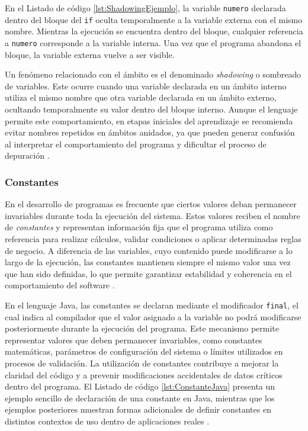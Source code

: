 \documentclass[12pt,twoside]{book}
\begin{document}
						En el Listado de código \ref{lst:ShadowingEjemplo}, la variable \texttt{numero} declarada dentro del bloque del \texttt{if} oculta temporalmente a la variable externa con el mismo nombre. Mientras la ejecución se encuentra dentro del bloque, cualquier referencia a \texttt{numero} corresponde a la variable interna. Una vez que el programa abandona el bloque, la variable externa vuelve a ser visible.
						
						Un fenómeno relacionado con el ámbito es el denominado \textit{shadowing} o sombreado de variables. Este ocurre cuando una variable declarada en un ámbito interno utiliza el mismo nombre que otra variable declarada en un ámbito externo, ocultando temporalmente su valor dentro del bloque interno. Aunque el lenguaje permite este comportamiento, en etapas iniciales del aprendizaje se recomienda evitar nombres repetidos en ámbitos anidados, ya que pueden generar confusión al interpretar el comportamiento del programa y dificultar el proceso de depuración \cite{Qian2018Students,Robins2003Learning,Lister2004Learning}.
	
					\subsubsection{Constantes}
						\noindent
						En el desarrollo de programas es frecuente que ciertos valores deban permanecer invariables durante toda la ejecución del sistema. Estos valores reciben el nombre de \textit{constantes} y representan información fija que el programa utiliza como referencia para realizar cálculos, validar condiciones o aplicar determinadas reglas de negocio. A diferencia de las variables, cuyo contenido puede modificarse a lo largo de la ejecución, las constantes mantienen siempre el mismo valor una vez que han sido definidas, lo que permite garantizar estabilidad y coherencia en el comportamiento del software \cite{Sebesta2018Concepts,Pierce2002Types}.
						
						En el lenguaje Java, las constantes se declaran mediante el modificador \texttt{final}, el cual indica al compilador que el valor asignado a la variable no podrá modificarse posteriormente durante la ejecución del programa. Este mecanismo permite representar valores que deben permanecer invariables, como constantes matemáticas, parámetros de configuración del sistema o límites utilizados en procesos de validación. La utilización de constantes contribuye a mejorar la claridad del código y a prevenir modificaciones accidentales de datos críticos dentro del programa. El Listado de código \ref{lst:ConstanteJava} presenta un ejemplo sencillo de declaración de una constante en Java, mientras que los ejemplos posteriores muestran formas adicionales de definir constantes en distintos contextos de uso dentro de aplicaciones reales \cite{Sebesta2018Concepts,Pierce2002Types,Pressman2019Software}.
						
\end{document}
